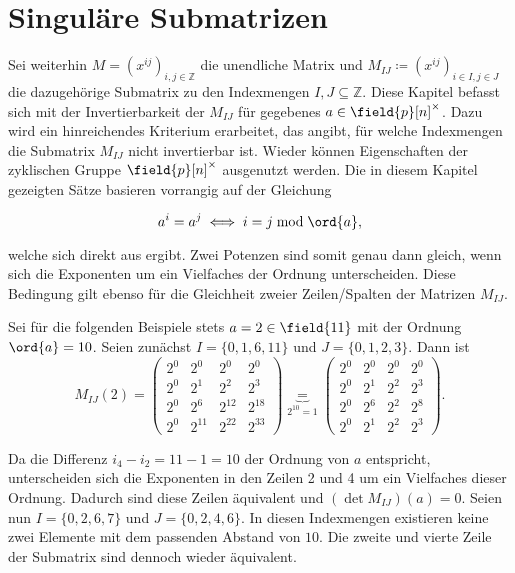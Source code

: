 \section{Singuläre Submatrizen} \label{sec:singulaereSubmatrizen}

Sei weiterhin $M = \left( x^{ij} \right)_{i,j \in \mathbb{Z}}$ die unendliche Matrix und $M_{IJ} \coloneqq \left( x^{ij} \right)_{i \in I,j \in J}$ die dazugehörige Submatrix zu den Indexmengen $I,J \subseteq \mathbb{Z}$. Diese Kapitel befasst sich mit der Invertierbarkeit der $M_{IJ}$ für gegebenes $a \in \field{p}[n]^\times$. Dazu wird ein hinreichendes Kriterium erarbeitet, das angibt, für welche Indexmengen die Submatrix $M_{IJ}$ nicht invertierbar ist. Wieder können Eigenschaften der zyklischen Gruppe $\field{p}[n]^\times$ ausgenutzt werden. Die in diesem Kapitel gezeigten Sätze basieren vorrangig auf der Gleichung

\begin{equation*}
    a^i = a^j \iff i = j \bmod \ord{a},
\end{equation*}

welche sich direkt aus  ergibt. Zwei Potenzen sind somit genau dann gleich, wenn sich die Exponenten um ein Vielfaches der Ordnung unterscheiden. Diese Bedingung gilt ebenso für die Gleichheit zweier Zeilen/Spalten der Matrizen $M_{IJ}$. 

Sei für die folgenden Beispiele stets $a = 2 \in \field{11}$ mit der Ordnung $\ord{a} = 10$. Seien zunächst $I=\{0,1,6,11\}$ und $J=\{0,1,2,3\}$. Dann ist 
\begin{equation*}
    M_{IJ}(2) = \begin{pmatrix}
        2^{0} & 2^{0} & 2^{0} & 2^{0} \\
        2^{0} & 2^{1} & 2^{2} & 2^{3} \\
        2^{0} & 2^{6} & 2^{12} & 2^{18} \\
        2^{0} & 2^{11} & 2^{22} & 2^{33} 
    \end{pmatrix} \underbrace{=}_{2^{10}=1} \begin{pmatrix}
        2^{0} & 2^{0} & 2^{0} & 2^{0} \\
        2^{0} & 2^{1} & 2^{2} & 2^{3} \\
        2^{0} & 2^{6} & 2^{2} & 2^{8} \\
        2^{0} & 2^{1} & 2^{2} & 2^{3} 
    \end{pmatrix}.
\end{equation*}

Da die Differenz $i_4 - i_2 = 11 - 1 = 10$ der Ordnung von $a$ entspricht, unterscheiden sich die Exponenten in den Zeilen 2 und 4 um ein Vielfaches dieser Ordnung. Dadurch sind diese Zeilen äquivalent und $(\det M_{IJ})(a) = 0$.
Seien nun $I=\{0,2,6,7\}$ und $J=\{0,2,4,6\}$. In diesen Indexmengen existieren keine zwei Elemente mit dem passenden Abstand von $10$. Die zweite und vierte Zeile der Submatrix sind dennoch wieder äquivalent.

